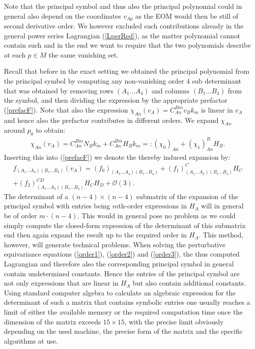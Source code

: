 Note that the principal symbol and thus also the principal polynomial could in general also depend on the coordinates $v_{Ap}$ as the EOM would then be still of second derivative order. We however excluded such contributions already in the general power series Lagrangian (\ref{LperRed}),  as the matter polynomial cannot contain such and in the end we want to require that the two polynomials describe at each $p \in M$ the same vanishing set. 

Recall that before in the exact setting we obtained the principal polynomial from the principal symbol by computing any non-vanishing order $4$ sub determinant that was obtained by removing rows $(A_1...A_4)$ and columns $(B_1...B_4)$ from the symbol, and then dividing the expression by the appropriate prefactor (\ref{prefacF}).
Note that also the expression $\chi_{An}(v_A) = C_{An}^{Bm}v_Bk_m$ is linear in $v_A$ and hence also the prefactor contributes in different orders. We expand $\chi_{An}$ around $p_0$ to obtain:
\begin{align}
\chi_{An}(v_A) =  C^{Bm}_{An} N_B k_m + C^{Bm}_{An} H_B k_m =: (\chi_0)_{An} + (\chi_1)^B_{An}H_B.
\end{align}
Inserting this into (\ref{prefacF}) we denote the thereby induced expansion by:
\begin{multline}\label{prefacExp}
    f_{(A_1...A_4)(B_1...B_4)}(v_A) = (f_0)_{(A_1...A_4)(B_1...B_4)} + (f_1)^C_{(A_1...A_4)(B_1...B_4)}H_C\\ + (f_2)^{CD}_{(A_1...A_4)(B_1...B_4)}H_CH_D
    + \mathcal{O}(3).
\end{multline}
The determinant of a $(n-4) \times (n-4)$ submatrix of the expansion of the principal symbol with entries being $m$th-order expressions in $H_A$ will in general be of order $m\cdot(n-4)$. This would in general pose no problem as we could simply compute the closed-form expression of the determinant of this submatrix end then again expand the result up to the required order in $H_A$. This method, however, will generate technical problems. When solving the perturbative equivariance equations (\ref{order1}), (\ref{order2}) and (\ref{order3}), the thus computed Lagrangian and therefore also the corresponding principal symbol in general contain undetermined constants. Hence the entries of the principal symbol are not only expressions that are linear in $H_A$ but also contain additional constants. Using standard computer algebra to calculate an algebraic expression for the determinant of such a matrix that contains symbolic entries one usually reaches a limit of either the available memory or the required computation time once the dimension of the matrix exceeds $15 \times 15$, with the precise limit obviously depending on the used machine, the precise form of the matrix and the specific algorithms at use. 

